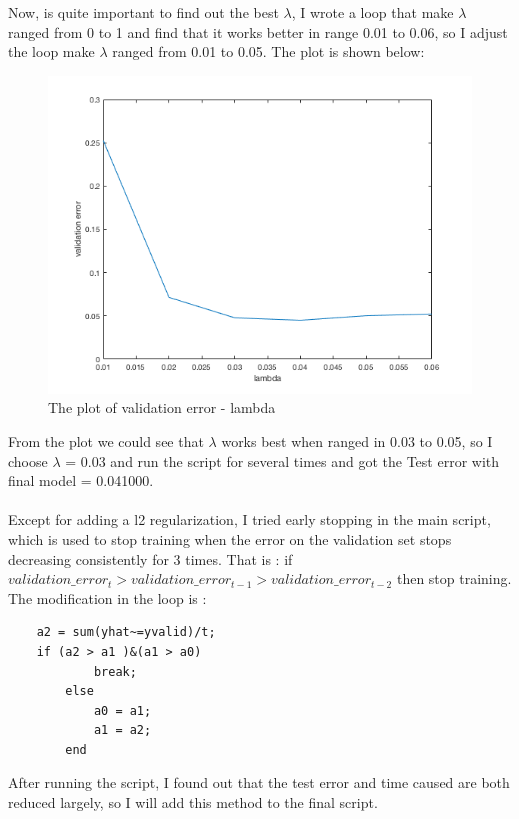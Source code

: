 \documentclass[12pt]{article}
\begin{document}
Now, is quite important to find out the best $\lambda$, I wrote a loop that make $\lambda$ ranged from 0 to 1 and find that it works better in range 0.01 to 0.06, so I adjust the loop make $\lambda$ ranged from 0.01 to 0.05. The plot is shown below:
\begin{figure}[H]
	\centering
	\includegraphics[width=12cm]{findLambda.png}
	\caption{The plot of validation error - lambda }
\end{figure}
From the plot we could see that $\lambda$ works best when ranged in 0.03 to 0.05, so I choose $\lambda$ = 0.03 and run the script for several times and got the Test error with final model = 0.041000.\\
\\
Except for adding a l2 regularization, I tried early stopping in the main script, which is used to stop training when the error on the validation set stops decreasing consistently for 3 times. That is : if $ validation\_error_t > validation\_error_{t-1}  > validation\_error_{t-2} $ then stop training. The modification in the loop is :
\begin{lstlisting}
	a2 = sum(yhat~=yvalid)/t;
	if (a2 > a1 )&(a1 > a0) 
            break;
        else
            a0 = a1;
            a1 = a2;
        end        
\end{lstlisting}
After running the script, I found out that the test error and time caused are both reduced largely, so I will add this method to the final script.
\end{document}
